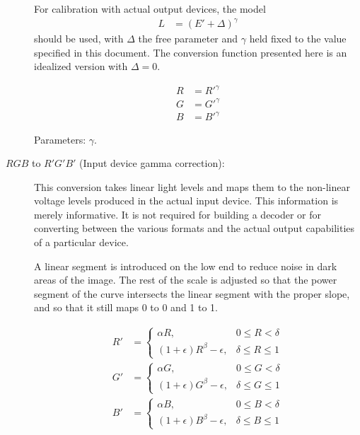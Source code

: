 \documentclass[9pt,letterpaper]{book}
\numberwithin{equation}{chapter}
\numberwithin{figure}{chapter}
\numberwithin{table}{chapter}
\begin{document}
\begin{description}
For calibration with actual output devices, the model
\begin{align}
L & =(E'+\Delta)^\gamma
\end{align}
 should be used, with $\Delta$ the free parameter and $\gamma$ held fixed to
 the value specified in this document.
The conversion function presented here is an idealized version with $\Delta=0$.

\begin{align}
R & = R'^\gamma \\
G & = G'^\gamma \\
B & = B'^\gamma
\end{align}

Parameters: $\gamma$.

\item[$RGB$ to $R'G'B'$ (Input device gamma correction):]
\vspace{\baselineskip}\hfill


This conversion takes linear light levels and maps them to the non-linear
 voltage levels produced in the actual input device.
This information is merely informative.
It is not required for building a decoder or for converting between the various
 formats and the actual output capabilities of a particular device.

A linear segment is introduced on the low end to reduce noise in dark areas of
 the image.
The rest of the scale is adjusted so that the power segment of the curve
 intersects the linear segment with the proper slope, and so that it still maps
 0 to 0 and 1 to 1.

\begin{align}
R' & = \left\{
\begin{array}{ll}
\alpha R,                     & 0\le R<\delta   \\
(1+\epsilon)R^\beta-\epsilon, & \delta\le R\le1
\end{array}\right. \\
G' & = \left\{
\begin{array}{ll}
\alpha G,                     & 0\le G<\delta   \\
(1+\epsilon)G^\beta-\epsilon, & \delta\le G\le1
\end{array}\right. \\
B' & = \left\{
\begin{array}{ll}
\alpha B,                     & 0\le B<\delta   \\
(1+\epsilon)B^\beta-\epsilon, & \delta\le B\le1
\end{array}\right.
\end{align}


\end{description}
\end{document}
